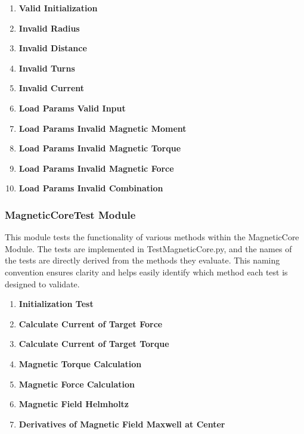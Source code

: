 \documentclass[12pt, titlepage]{article}
\newcommand{\UTthettnum}{UT\theuttnum}
\begin{document}
\begin{enumerate}
  \item[\refstepcounter{uttnum} \UTthettnum:] \textbf{Valid Initialization}
  \item[\refstepcounter{uttnum} \UTthettnum:] \textbf{Invalid Radius}
  \item[\refstepcounter{uttnum} \UTthettnum:] \textbf{Invalid Distance}
  \item[\refstepcounter{uttnum} \UTthettnum:] \textbf{Invalid Turns}
  \item[\refstepcounter{uttnum} \UTthettnum:] \textbf{Invalid Current}
   \item[\refstepcounter{uttnum} \UTthettnum:] \textbf{Load Params Valid Input}
  \item[\refstepcounter{uttnum} \UTthettnum:] \textbf{Load Params Invalid Magnetic Moment}
  \item[\refstepcounter{uttnum} \UTthettnum:] \textbf{Load Params Invalid Magnetic Torque}
  \item[\refstepcounter{uttnum} \UTthettnum:] \textbf{Load Params Invalid Magnetic Force}
  \item[\refstepcounter{uttnum} \UTthettnum:] \textbf{Load Params Invalid Combination}
\end{enumerate}

\subsubsection{MagneticCoreTest Module}

This module tests the functionality of various methods within the MagneticCore Module. The tests are implemented in TestMagneticCore.py, and the names of the tests are directly derived from the methods they evaluate. This naming convention ensures clarity and helps easily identify which method each test is designed to validate. 

\begin{enumerate}
  \item[\refstepcounter{uttnum} \UTthettnum:] \textbf{Initialization Test}
  \item[\refstepcounter{uttnum} \UTthettnum:] \textbf{Calculate Current of Target Force}
  \item[\refstepcounter{uttnum} \UTthettnum:] \textbf{Calculate Current of Target Torque}
  \item[\refstepcounter{uttnum} \UTthettnum:] \textbf{Magnetic Torque Calculation}
  \item[\refstepcounter{uttnum} \UTthettnum:] \textbf{Magnetic Force Calculation}
  \item[\refstepcounter{uttnum} \UTthettnum:] \textbf{Magnetic Field Helmholtz}
  \item[\refstepcounter{uttnum} \UTthettnum:] \textbf{Derivatives of Magnetic Field Maxwell at Center} 
\end{enumerate}
\end{document}
